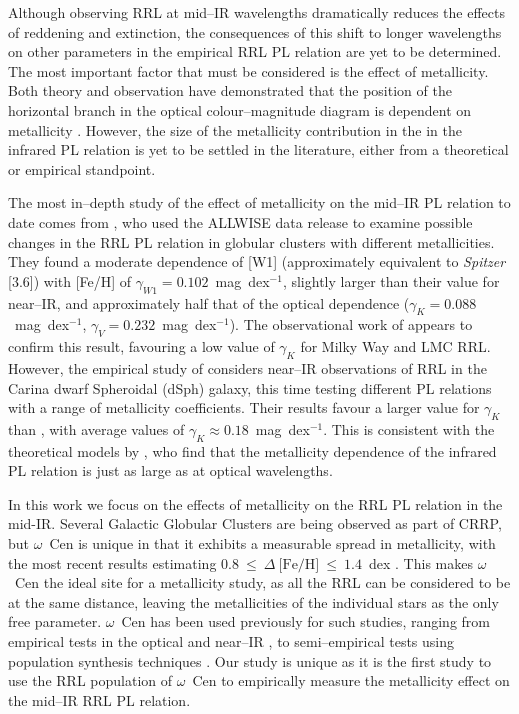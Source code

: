 \documentclass[a4paper,fleqn,usenatbib]{mnras}
\begin{document}
Although observing RRL at mid--IR wavelengths dramatically reduces the effects of reddening and extinction, the consequences of this shift to longer wavelengths on other parameters in the empirical RRL PL relation are yet to be determined. The most important factor that must be considered is the effect of metallicity. Both theory and observation have demonstrated that the position of the horizontal branch in the optical colour--magnitude diagram is dependent on metallicity \citep[e.g.][]{2015ApJ...808...50M, 2004ApJS..154..633C, 2003MNRAS.344.1097B, 1994AJ....108..222N}. However, the size of the metallicity contribution in the in the infrared PL relation is yet to be settled in the literature, either from a theoretical or empirical standpoint. 

The most in--depth study of the effect of metallicity on the mid--IR PL relation to date comes from \citet{2014MNRAS.439.3765D, 2015PKAS...30..183D}, who used the ALLWISE data release \citep{2010AJ....140.1868W, 2013wise.rept....1C} to examine possible changes in the RRL PL relation in globular clusters with different metallicities. They found a moderate dependence of [W1] (approximately equivalent to {\it Spitzer} [3.6]) with [Fe/H] of $\gamma_{W1} = 0.102$~mag~dex$^{-1}$, slightly larger than their value for near--IR, and approximately half that of the optical dependence ($\gamma_{K} = 0.088$~mag~dex$^{-1}$, $\gamma_{V} = 0.232$~mag~dex$^{-1}$). The observational work of \citet{2015ApJ...807..127M} appears to confirm this result, favouring a low value of $\gamma_K$ for Milky Way and LMC RRL. However, the empirical study of \citet{2015AJ....150...90K} considers near--IR observations of RRL in the Carina dwarf Spheroidal (dSph) galaxy, this time testing different PL relations with a range of metallicity coefficients. Their results favour a larger value for $\gamma_K$ than \citet{2015PKAS...30..183D}, with average values of $\gamma_K \approx 0.18$~mag~dex$^{-1}$. This is consistent with the theoretical models by \citet{2015ApJ...808...50M}, who find that the metallicity dependence of the infrared PL relation is just as large as at optical wavelengths.

In this work we focus on the effects of metallicity on the RRL PL relation in the mid-IR. Several Galactic Globular Clusters are being observed as part of CRRP, but $\omega$~Cen is unique in that it exhibits a measurable spread in metallicity, with the most recent results estimating $0.8~\leq~\Delta~\text{[Fe/H]}~\leq~1.4$~dex \citep{2014ApJ...791..107V, 2012ApJ...746...14M, 2010ApJ...722.1373J}. This makes $\omega$~Cen the ideal site for a metallicity study, as all the RRL can be considered to be at the same distance, leaving the metallicities of the individual stars as the only free parameter. $\omega$~Cen has been used previously for such studies, ranging from empirical tests in the optical \citep[e.g.][]{2003MNRAS.345...86O, 1991ApJ...373L..43L} and near--IR \citep[e.g.][]{2006MmSAI..77..245C, 2006ApJ...652..362D}, to semi--empirical tests using population synthesis techniques \citep{2016MNRAS.457.4525T}. Our study is unique as it is the first study to use the RRL population of $\omega$~Cen to empirically measure the metallicity effect on the mid--IR RRL PL relation.
\end{document}

